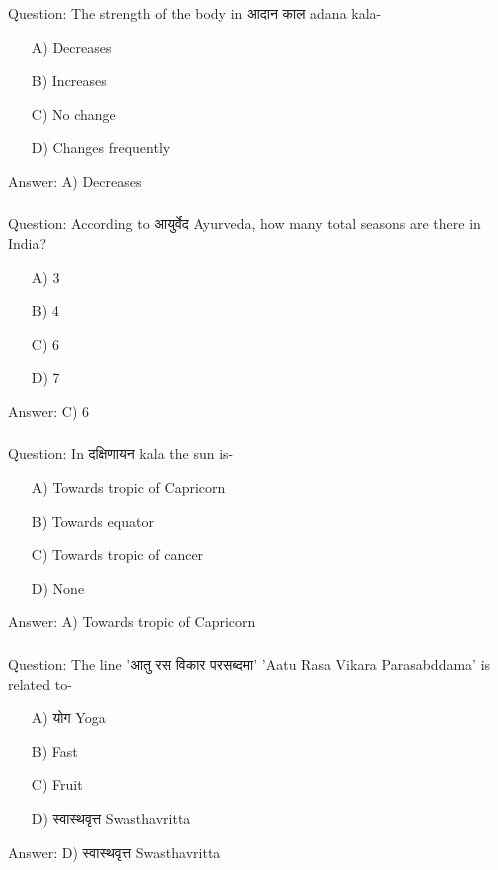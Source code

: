 \begin{frame}[fragile]\frametitle{}

Question: The strength of the body in आदान काल adana kala-

\begin{itemize}
\item[A)] Decreases
\item[B)] Increases
\item[C)] No change
\item[D)] Changes frequently
\end{itemize}

Answer: A) Decreases
\end{frame}

\begin{frame}[fragile]\frametitle{}

Question: According to आयुर्वेद Ayurveda, how many total seasons are there in India?

\begin{itemize}
\item[A)] 3
\item[B)] 4
\item[C)] 6
\item[D)] 7
\end{itemize}

Answer: C) 6
\end{frame}

\begin{frame}[fragile]\frametitle{}

Question: In दक्षिणायन kala the sun is-

\begin{itemize}
\item[A)] Towards tropic of Capricorn
\item[B)] Towards equator
\item[C)] Towards tropic of cancer
\item[D)] None
\end{itemize}

Answer: A) Towards tropic of Capricorn
\end{frame}

\begin{frame}[fragile]\frametitle{}

Question: The line 'आतु रस विकार परसब्दमा' 'Aatu Rasa Vikara Parasabddama' is related to-

\begin{itemize}
\item[A)] योग Yoga
\item[B)] Fast
\item[C)] Fruit
\item[D)] स्वास्थवृत्त Swasthavritta
\end{itemize}

Answer: D) स्वास्थवृत्त Swasthavritta
\end{frame}

